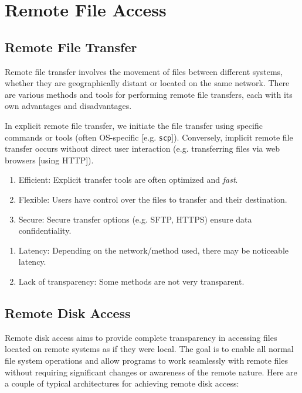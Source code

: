 \documentclass{report}
\begin{document}
\section{Remote File Access}


\subsection{Remote File Transfer}
Remote file transfer involves the movement of files between different systems, whether they are
geographically distant or located on the same network. There are various methods and tools for
performing remote file transfers, each with its own advantages and disadvantages.

In explicit remote file transfer, we initiate the file transfer using specific commands or tools
(often OS-specific [e.g. \texttt{scp}]). Conversely, implicit remote file transfer occurs without
direct user interaction (e.g. transferring files via web browsers [using HTTP]).

\begin{tcbraster}[raster columns=2, raster equal height, raster force size=false]
  \begin{tcolorbox}[colback=green!5!white,colframe=black!75!green,title=Advantages]
    \begin{enumerate}[label=\textit{(\roman*)}]
    \item Efficient: Explicit transfer tools are often optimized and \textit{fast}.
    \item Flexible: Users have control over the files to transfer and their destination.
    \item Secure: Secure transfer options (e.g. SFTP, HTTPS) ensure data confidentiality.
    \end{enumerate}
  \end{tcolorbox}
  \begin{tcolorbox}[colback=red!5!white,colframe=black!40!red,title=Disadvantages]
    \begin{enumerate}[label=\textit{(\roman*)}]
    \item Latency: Depending on the network/method used, there may be noticeable latency.
    \item Lack of transparency: Some methods are not very transparent.
    \end{enumerate}
  \end{tcolorbox}
\end{tcbraster}


\subsection{Remote Disk Access}
Remote disk access aims to provide complete transparency in accessing files located on remote
systems as if they were local. The goal is to enable all normal file system operations and allow
programs to work seamlessly with remote files without requiring significant changes or awareness of
the remote nature. Here are a couple of typical architectures for achieving remote disk access: 
\end{document}
